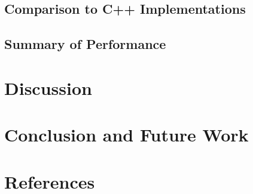 \documentclass[letterpaper,twocolumn,11pt]{article}
\begin{document}
\subsection{Comparison to C++ Implementations}

\subsection{Summary of Performance}

\section{Discussion}

\section{Conclusion and Future Work}

\section{References}
\end{document}
